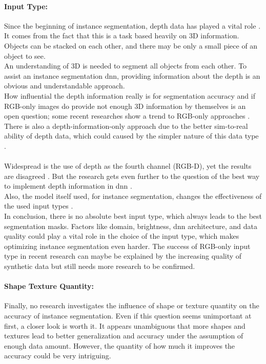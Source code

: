 		\paragraph{Input Type:} Since the beginning of instance segmentation, depth data has played a vital role \cite{Silbermann2012}. It comes from the fact that this is a task based heavily on 3D information. Objects can be stacked on each other, and there may be only a small piece of an object to see.\\
		An understanding of 3D is needed to segment all objects from each other. To assist an instance segmentation \ac{dnn}, providing information about the depth is an obvious and understandable approach.\\
		How influential the depth information really is for segmentation accuracy and if RGB-only images do provide not enough 3D information by themselves is an open question; some recent researches show a trend to RGB-only approaches \cite{Raj2023}\cite{Zakeri2024}.\\
		There is also a depth-information-only approach due to the better sim-to-real ability of depth data, which could caused by the simpler nature of this data type \cite{Danielczuk2019}.\\\\
		Widespread is the use of depth as the fourth channel (RGB-D), yet the results are disagreed \cite{Lüling2021}\cite{Zakeri2024}.
		But the research gets even further to the question of the best way to implement depth information in \ac{dnn} \cite{Xiang2021}\cite{Xie2020}\cite{Pei2024}\cite{Yasir2022}\cite{Shao2018}\cite{Ye2017}.\\
		Also, the model itself used, for instance segmentation, changes the effectiveness of the used input types \cite{Xiang2021}.\\
		In conclusion, there is no absolute best input type, which always leads to the best segmentation masks. Factors like domain, brightness, \ac{dnn} architecture, and data quality could play a vital role in the choice of the input type, which makes optimizing instance segmentation even harder. The success of RGB-only input type in recent research \cite{Raj2023}\cite{Zakeri2024} can maybe be explained by the increasing quality of synthetic data but still needs more research to be confirmed.
		\paragraph{Shape Texture Quantity:} Finally, no research investigates the influence of shape or texture quantity on the accuracy of instance segmentation. Even if this question seems unimportant at first, a closer look is worth it. It appears unambiguous that more shapes and textures lead to better generalization and accuracy under the assumption of enough data amount. However, the quantity of how much it improves the accuracy could be very intriguing. 
		


